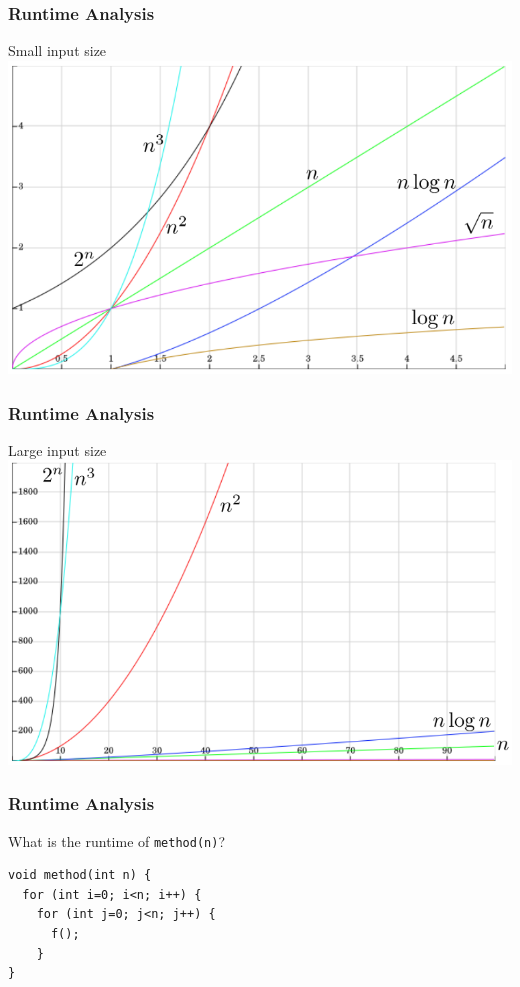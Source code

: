 \begin{frame}[fragile]
\frametitle{Runtime Analysis}
Small input size\\
\centering\includegraphics[scale=0.4]{img/runtime1.png}
\end{frame}

\begin{frame}[fragile]
\frametitle{Runtime Analysis}
Large input size\\
\centering\includegraphics[scale=0.4]{img/runtime2.png}
\end{frame}

\begin{frame}[fragile]
\frametitle{Runtime Analysis}
\begin{example}
What is the runtime of \verb|method(n)|?
\begin{lstlisting}
void method(int n) {
  for (int i=0; i<n; i++) {
    for (int j=0; j<n; j++) {
      f();
    }
}
\end{lstlisting}
\end{example}

\end{frame}

